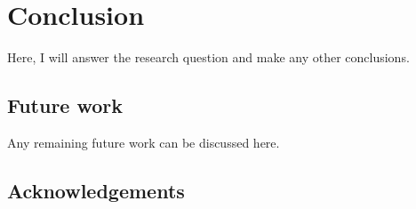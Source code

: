 \chapter{Conclusion}
\label{chapter:conclusion}
Here, I will answer the research question and make any other conclusions.

\section{Future work}
\label{section:futurework}
Any remaining future work can be discussed here.

\section{Acknowledgements}
\label{section:acknowledgements}
